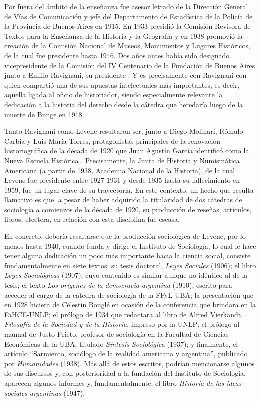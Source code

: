 Por fuera del ámbito de la enseñanza fue asesor letrado de la Dirección General de Vías de Comunicación y jefe del Departamento de Estadística de la Policía de la Provincia de Buenos Aires en 1915. En 1933 presidió la Comisión Revisora de Textos para la Enseñanza de la Historia y la Geografía y en 1938 promovió la creación de la Comisión Nacional de Museos, Monumentos y Lugares Históricos, de la cual fue presidente hasta 1946. Dos años antes había sido designado vicepresidente de la Comisión del IV Centenario de la Fundación de Buenos Aires junto a Emilio Ravignani, su presidente \parencite{1686-HERAS1959}. Y es precisamente con Ravignani con quien compartió una de sus apuestas intelectuales más importantes, es decir, aquella ligada al oficio de historiador, siendo especialmente relevante la dedicación a la historia del derecho desde la cátedra que heredaría luego de la muerte de Bunge en 1918.

Tanto Ravignani como Levene resultaron ser, junto a Diego Molinari, Rómulo Carbia y Luis María Torres, protagonistas principales de la renovación historiográfica de la década de 1920 que Juan Agustín García identificó como la Nueva Escuela Histórica \parencite{282-ZARRILLI1998}. Precisamente, la Junta de Historia y Numismática Americana (a partir de 1938, Academia Nacional de la Historia), de la cual Levene fue presidente entre 1927-1931 y desde 1935 hasta su fallecimiento en 1959, fue un lugar clave de su trayectoria. En este contexto, un hecho que resulta llamativo es que, a pesar de haber adquirido la titularidad de dos cátedras de sociología a comienzos de la década de 1920, su producción de reseñas, artículos, libros, etcétera, en relación con esta disciplina fue escasa.

En concreto, debería resaltarse que la producción sociológica de Levene, por lo menos hasta 1940, cuando funda y dirige el Instituto de Sociología, lo cual le hace tener alguna dedicación un poco más importante hacia la ciencia social, consiste fundamentalmente en siete textos: su tesis doctoral, \emph{Leyes Sociales} (1906); el libro \emph{Leyes Sociológicas} (1907), cuyo contenido es similar aunque no idéntico al de la tesis; el texto \emph{Los orígenes de la democracia argentina} (1910), escrito para acceder al cargo de la cátedra de sociología de la FFyL-UBA; la presentación que en 1928 hiciera de Célestin Bouglé en ocasión de la conferencia que brindara en la FaHCE-UNLP; el prólogo de 1934 que redactara al libro de Alfred Vierkandt, \emph{Filosofía de la Sociedad y de la Historia}, impreso por la UNLP; el prólogo al manual de Justo Prieto, profesor de sociología en la Facultad de Ciencias Económicas de la UBA, titulado \emph{Síntesis Sociológica} (1937); y finalmente, el artículo \enquote{Sarmiento, sociólogo de la realidad americana y argentina}, publicado por \emph{Humanidades} (1938). Más allá de estos escritos, podrían mencionarse algunos de sus discursos \parencite{1621-ESCUDERO2010} y, con posterioridad a la fundación del Instituto de Sociología, aparecen algunos informes y, fundamentalmente, el libro \emph{Historia de las ideas sociales argentinas} (1947).

